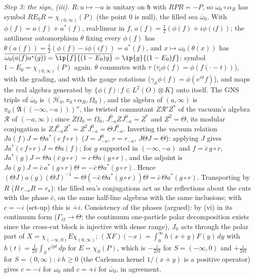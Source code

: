 \emph{Step 3: the sign, (iii).} $R : u \mapsto -u$ is unitary on $\mathfrak{h}$ with $RPR = -P$, so $\omega_{0}\circ\alpha_{R}$ has symbol $RE_{0}R = \chi_{(0,\infty)}(P)$ (the point $0$ is null), the filled sea $\bar\omega_{0}$. With $\phi(f) = a(f) + a^{*}(f)$, real-linear in $f$, $a(f) = \tfrac12(\phi(f) + i\phi(if))$; the antilinear automorphism $\theta$ fixing every $\phi(f)$ has $\theta(a(f)) = \tfrac12(\phi(f) - i\phi(if)) = a^{*}(f)$, and $x \mapsto \overline{\omega_{0}(\theta(x))}$ has $\overline{\omega_{0}(a(f)a^{*}(g))} = \overline{\ip{f}{(1 - E_{0})g}} = \ip{g}{(1 - E_{0})f}$: symbol $1 - E_{0} = \chi_{(0,\infty)}(P)$ again. $\theta$ commutes with $\tau$ ($\tau_{t}\phi(f) = \phi(f(\cdot - t))$), with the grading, and with the gauge rotations ($\gamma_{\vartheta}\phi(f) = \phi(e^{i\vartheta}f)$), and maps the real algebra generated by $\{\phi(f) : f \in L^{2}(O)\otimes K\}$ onto itself. The GNS triple of $\bar\omega_{0}$ is $(\mathcal{H}_{0}, \pi_{0}\circ\alpha_{R}, \Omega_{0})$, and the algebra of $(a, \infty)$ is $\pi_{0}(\mathfrak{A}((-\infty, -a)))''$, the twisted commutant $Z\mathcal{R}'Z^{*}$ of the vacuum's algebra $\mathcal{R}$ of $(-a, \infty)$; since $Z\Omega_{0} = \Omega_{0}$, $J^{0}_{-a}ZJ^{0}_{-a} = Z^{*}$ and $Z^{2} = \Theta$, its modular conjugation is $ZJ^{0}_{-a}Z^{*} = Z^{2}J^{0}_{-a} = \Theta J^{0}_{-a}$. Inverting the vacuum relation $J a(f) J = \Theta a^{*}(c\,f\circ r)$ ($J = J^{0}_{-a}$, $r = r_{-a}$, $J\Theta J = \Theta$): applying $J$ gives $Ja^{*}(c\,f\circ r)J = \Theta a(f)$; for $g$ supported in $(-\infty, -a)$ and $f = \bar c\,g\circ r$, $Ja^{*}(g)J = \Theta a(\bar c\,g\circ r) = c\,\Theta a(g\circ r)$, and the adjoint is $J a(g) J = \bar c\,a^{*}(g\circ r)\Theta = -\bar c\,\Theta a^{*}(g\circ r)$. Hence $(\Theta J)a(g)(\Theta J)^{-1} = \Theta(-\bar c\,\Theta a^{*}(g\circ r))\Theta = \bar c\,\Theta a^{*}(g\circ r)$. Transporting by $R$ ($R\,r_{-a}R = r_{a}$): the filled sea's conjugations act as the reflections about the cuts with the phase $\bar c$, on the same half-line algebras with the same inclusions; with $c = -i$ (set-up) this is $+i$. Consistency of the phases (argued): by (vi) in its continuum form ($\Gamma_{\Omega} \to \Theta$; the continuum one-particle polar decomposition exists since the cross-cut block is injective with dense range), $J_{0}$ acts through the polar part of $X = \chi_{(-\infty,0)}E\chi_{(0,\infty)}$; $(XF)(-x) = \int_{0}^{\infty}h(x + y)F(y)\,dy$ with $h(t) = \frac{1}{2\pi}\int_{S}e^{ipt}\,dp$ for $E = \chi_{S}(P)$, which is $-\frac{i}{2\pi t}$ for $S = (-\infty, 0)$ and $+\frac{i}{2\pi t}$ for $S = (0, \infty)$; $\bar c\,h \geq 0$ (the Carleman kernel $1/(x + y)$ is a positive operator) gives $c = -i$ for $\omega_{0}$ and $c = +i$ for $\bar\omega_{0}$, in agreement.

